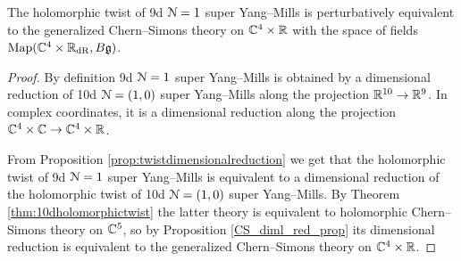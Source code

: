 \documentclass[10pt, oneside]{article}
\begin{document}
\begin{thm}
The holomorphic twist of 9d $\mathcal{N}=1$ super Yang--Mills is perturbatively equivalent to the generalized Chern--Simons theory on $\mathbb C^4\times \mathbb R$ with the space of fields $\operatorname{Map}(\mathbb C^4\times \mathbb R_{\mathrm{dR}}, B\mathfrak{g})$.
\end{thm}
\begin{proof}
By definition 9d $\mathcal{N}=1$ super Yang--Mills is obtained by a dimensional reduction of 10d $\mathcal{N}=(1, 0)$ super Yang--Mills along the projection $\mathbb R^{10}\rightarrow \mathbb R^9$. In complex coordinates, it is a dimensional reduction along the projection $\mathbb C^4\times \mathbb C\rightarrow \mathbb C^4\times \mathbb R$.

From Proposition \ref{prop:twistdimensionalreduction} we get that the holomorphic twist of 9d $\mathcal{N}=1$ super Yang--Mills is equivalent to a dimensional reduction of the holomorphic twist of 10d $\mathcal{N}=(1, 0)$ super Yang--Mills. By Theorem \ref{thm:10dholomorphictwist} the latter theory is equivalent to holomorphic Chern--Simons theory on $\mathbb C^5$, so by Proposition \ref{CS_diml_red_prop} its dimensional reduction is equivalent to the generalized Chern--Simons theory on $\mathbb C^4\times \mathbb R$.
\end{proof}
\end{document}
